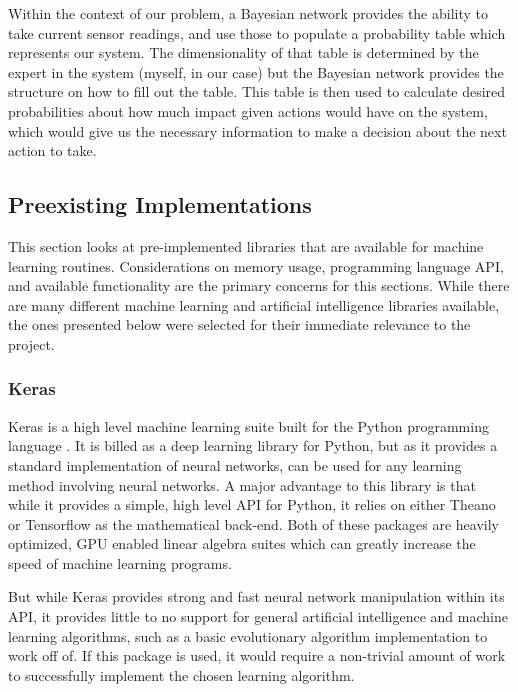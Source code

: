 \documentclass[draftclsnofoot,onecolumn,letterpaper,10pt]{IEEEtran}
\begin{document}
Within the context of our problem, a Bayesian network provides the ability to take current sensor readings, and use those to populate a probability table which represents our system.
The dimensionality of that table is determined by the expert in the system (myself, in our case) but the Bayesian network provides the structure on how to fill out the table.
This table is then used to calculate desired probabilities about how much impact given actions would have on the system, which would give us the necessary information to make a decision about the next action to take.

\subsection{Preexisting Implementations}
This section looks at pre-implemented libraries that are available for machine learning routines.
Considerations on memory usage, programming language API, and available functionality are the primary concerns for this sections.
While there are many different machine learning and artificial intelligence libraries available, the ones presented below were selected for their immediate relevance to the project.
\subsubsection{Keras}
Keras is a high level machine learning suite built for the Python programming language \cite{keras}.
It is billed as a deep learning library for Python, but as it provides a standard implementation of neural networks, can be used for any learning method involving neural networks.
A major advantage to this library is that while it provides a simple, high level API for Python, it relies on either Theano or Tensorflow as the mathematical back-end.
Both of these packages are heavily optimized, GPU enabled linear algebra suites which can greatly increase the speed of machine learning programs.

But while Keras provides strong and fast neural network manipulation within its API, it provides little to no support for general artificial intelligence and machine learning algorithms, such as a basic evolutionary algorithm implementation to work off of.
If this package is used, it would require a non-trivial amount of work to successfully implement the chosen learning algorithm.
\end{document}
